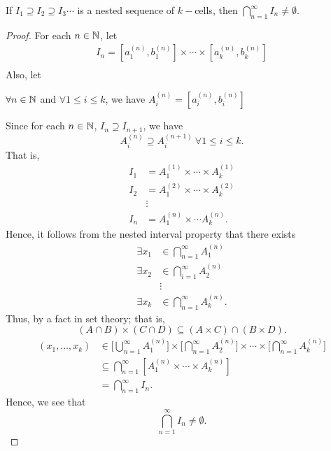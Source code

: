 \documentclass[a4paper]{report}
\begin{document}
\begin{theorem}
   If \( {I}_{1} \supseteq {I}_{2} \supseteq {I}_{3} \cdots  \) is a nested sequence of \( k - \)cells, then \( \bigcap_{ n=1 }^{ \infty  }  {I}_{n} \neq \emptyset \). 
\end{theorem}
\begin{proof}
    For each \( n \in \mathbb{N}  \), let 
    \begin{align*}
        {I}_{n} = [{a}_{1}^{(n)}, {b}_{1}^{(n)}] \times \cdots \times [{a}_{k}^{(n)}, {b}_{k}^{(n)}]  \\
    \end{align*}
    Also, let 
    \begin{center}
        \( \forall n \in \mathbb{N}  \) and \( \forall 1 \leq i \leq k  \), we have \( {A}_{i}^{(n)} = [{a}_{i}^{(n)}, {b}_{i}^{(n)}] \)
    \end{center}
    Since for each \( n \in \mathbb{N}  \), \( {I}_{n} \supseteq {I}_{n+1} \), we have
    \[  {A}_{i}^{(n) }  \supseteq {A}_{i}^{(n+1)}\ \forall 1 \leq i \leq k.  \]
    That is,
    \begin{align*}
       {I}_{1} &= {A}_{1}^{(1)} \times \cdots \times {A}_{k }^{(1)} \\
       {I}_{2} &= {A}_{1}^{(2)} \times \cdots \times {A}_{k}^{(2)} \\
               &\vdots  \\
        {I}_{n} &= {A}_{1}^{(n)} \times \cdots {A}_{k}^{(n)}.
    \end{align*}
    Hence, it follows from the nested interval property that there exists 
    \begin{align*}
        \exists {x}_{1} &\in \bigcap_{ n=1  }^{ \infty  } {A}_{1}^{(n)} \\
        \exists {x}_{2} &\in \bigcap_{ i=1  }^{ \infty   }  {A}_{2}^{(n)} \\
                        &\vdots \\
        \exists {x}_{k} &\in \bigcap_{ n=1  }^{ \infty  }  {A}_{k}^{(n)}. 
    \end{align*}
    Thus, by a fact in set theory; that is,  
    \[  (A \cap B) \times (C \cap D ) \subseteq  (A \times C ) \cap (B \times D). \]
    \begin{align*}
        ({x}_{1}, \dots, {x}_{k}) &\in \Big[\bigcup_{ n=1  }^{ \infty   }  {A}_{1}^{(n)} \Big] \times \Big[\bigcap_{ n=1  }^{ \infty  } {A}_{2}^{(n)} \Big] \times \cdots \times \Big[ \bigcap_{  n = 1 }^{ \infty  }  {A}_{k}^{(n)}\Big] \\
                                  &\subseteq \bigcap_{ n=1  }^{ \infty  }  [{A}_{1}^{(n)} \times \cdots \times {A}_{k}^{(n)}] \\
                                  &= \bigcap_{ n=1  }^{ \infty  }  {I}_{n}.
    \end{align*}
    Hence, we see that 
    \[  \bigcap_{ n=1  }^{ \infty  }  {I}_{n} \neq \emptyset. \]
\end{proof}
\end{document}
